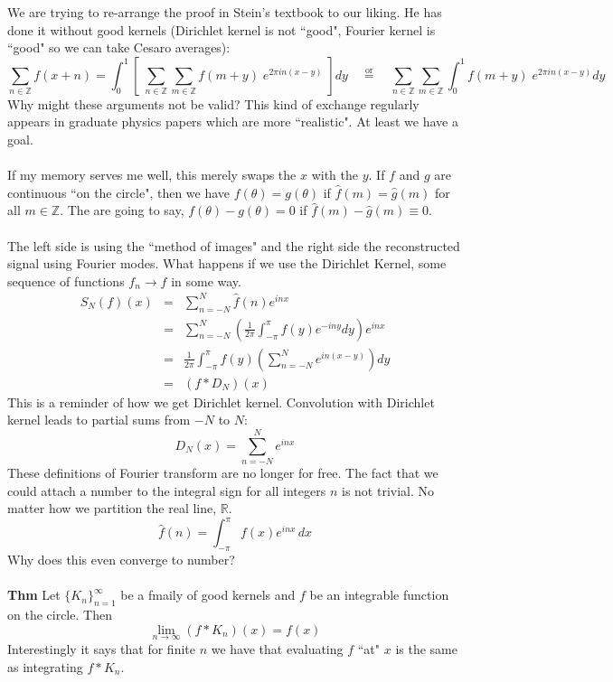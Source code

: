 \documentclass[12pt]{article}
\begin{document}
We are trying to re-arrange the proof in Stein's textbook to our liking.  He has done it without good kernels (Dirichlet kernel is not ``good", Fourier kernel is ``good" so we can take Cesaro averages):
$$\sum_{n \in \mathbb{Z}} f(x+n) =  \int_0^1 \left[ \; \sum_{n \in \mathbb{Z}}  \sum_{m \in \mathbb{Z}} f(m+y) \; e^{2\pi i n (x-y) } \; \right]  dy  \quad\stackrel{\text{or}}{=}\quad 
\sum_{n \in \mathbb{Z}}  \sum_{m \in \mathbb{Z}} \int_0^1  f(m+y) \; e^{2\pi i n (x-y) }   dy$$
Why might these arguments not be valid?  This kind of exchange regularly appears in graduate physics papers which are more ``realistic". At least we have a goal.   \\ \\
If my memory serves me well, this merely swaps the $x$ with the $y$.
If $f$ and $g$ are continuous ``on the circle", then we have $f(\theta) = g(\theta)$ if $\hat{f}(m) = \hat{g}(m)$ for all $m \in \mathbb{Z}$.  The are going to say, $f(\theta) - g(\theta) = 0$ if $\hat{f}(m) - \hat{g}(m)\equiv 0$. \\ \\
The left side is using the ``method of images" and the right side the reconstructed signal using Fourier modes.  What happens if we use the Dirichlet Kernel, some sequence of functions $f_n \to f$ in some way.
\begin{eqnarray*}
S_N(f)(x) &=& \sum_{n = - N}^N \hat{f}(n) e^{in x}  \\
&=& \sum_{n = -N}^N \left( \frac{1}{2\pi} \int_{-\pi}^\pi f(y) e^{-iny} dy \right) e^{in x} \\
&=& \frac{1}{2\pi} \int_{-\pi}^\pi f(y) \left( \sum_{n = - N}^N e^{in(x-y)}\right) dy \\
&=& (f * D_N)(x)
\end{eqnarray*}
This is a reminder of how we get Dirichlet kernel.  Convolution with Dirichlet kernel leads to partial sums from $-N$ to $N$:
$$ D_N(x) = \sum_{n = -N}^N e^{inx} $$
These definitions of Fourier transform are no longer for free.  The fact that we could attach a number to the integral sign for all integers $n$ is not trivial.  No matter how we partition the real line, $\mathbb{R}$.
$$ \hat{f}(n) = \int_{-\pi}^\pi f(x) e^{inx} \, dx $$
Why does this even converge to number? \\ \\
\textbf{Thm} Let $\{ K_n\}_{n=1}^\infty$ be a fmaily of good kernels and $f$ be an integrable function on the circle.  Then 
$$ \lim_{n \to \infty} (f * K_n)(x) = f(x) $$
Interestingly it says that for finite $n$ we have that evaluating $f$  ``at" $x$ is the same as integrating $f*K_n$.
\end{document}
